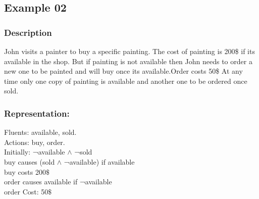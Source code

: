 \documentclass[11pt]{article}
\begin{document}
	\subsection{Example 02}\label{example:ex02}
	\subsubsection{Description}\label{par:p102}
	John visits a painter to buy a specific painting. The cost of painting is 200\$ if its available in the shop. But if painting is not available then John needs to order a new one to be painted and will buy once its available.Order costs 50\$ At any time only one copy of painting is available and another one to be ordered once sold. 
	
	\subsubsection{Representation:}\label{par:p202}
	\indent 
	Fluents: available, sold.\\
	Actions: buy, order.\\
	Initially: ¬available $\wedge$  ¬sold\\
	buy causes (sold $\land$ ¬available) if available\\
	buy costs 200$\$$ \\
	order causes available if ¬available\\
	order Cost: 50$\$$ \\
	
\end{document}
